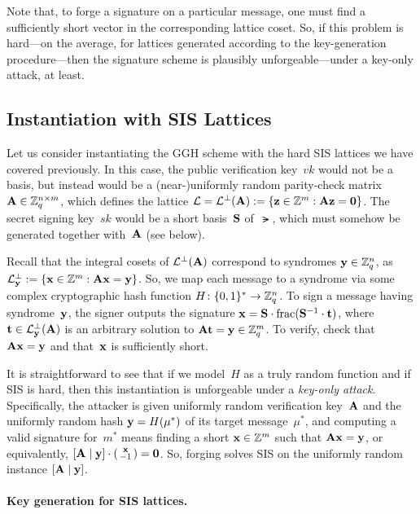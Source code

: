 \documentclass[11pt]{article}
\begin{document}
Note that, to forge a signature on a particular message, one must find
a sufficiently short vector in the corresponding lattice coset. So, if
this problem is hard---on the average, for lattices generated
according to the key-generation procedure---then the signature scheme
is plausibly unforgeable---under a key-only attack, at least.

\subsection{Instantiation with SIS Lattices}
\label{sec:instantiation-sis}

Let us consider instantiating the GGH scheme with the hard SIS
lattices we have covered previously. In this case, the public
verification key~$vk$ would not be a basis, but instead would be a
(near-)uniformly random parity-check matrix
$\mathbf{A} \in \mathbb{Z}_q^{n \times m}$, which defines the lattice
$\mathcal{L} = \mathcal{L}^{\perp}(\mathbf{A}) := \{\mathbf{z} \in \mathbb{Z}^{m} : \mathbf{A}
  \mathbf{z}=\mathbf{0}\}$. The secret signing key~$sk$ would be a short
basis~$\mathbf{S}$ of~$\lat$, which must somehow be generated together
with~$\mathbf{A}$ (see below).

Recall that the integral cosets of $\mathcal{L}^{\perp}(\mathbf{A})$ correspond to
syndromes $\mathbf{y} \in \mathbb{Z}_q^{n}$, as
$\mathcal{L}^{\perp}_{\mathbf{y}} := \{\mathbf{x} \in \mathbb{Z}^{m} : \mathbf{A} \mathbf{x} = \mathbf{y}\}$.
So, we map each message to a syndrome via some complex cryptographic
hash function $H \colon \{0,1\}^{*} \to \mathbb{Z}_q^{n}$. To sign a message
having syndrome~$\mathbf{y}$, the signer outputs the signature
$\mathbf{x} = \mathbf{S} \cdot \text{frac}(\mathbf{S}^{-1} \cdot \mathbf{t})$, where
$\mathbf{t} \in \mathcal{L}^{\perp}_{\mathbf{y}}(\mathbf{A})$ is an arbitrary solution to
$\mathbf{A} \mathbf{t} = \mathbf{y} \in \mathbb{Z}_q^m$. To verify, check that
$\mathbf{A} \mathbf{x} = \mathbf{y}$ and that~$\mathbf{x}$ is sufficiently short.

It is straightforward to see that if we model~$H$ as a truly random
function and if SIS is hard, then this instantiation is unforgeable
under a \emph{key-only attack}. Specifically, the attacker is given
uniformly random verification key~$\mathbf{A}$ and the uniformly random
hash $\mathbf{y} = H(\mu^{*})$ of its target message~$\mu^{*}$, and
computing a valid signature for~$m^{*}$ means finding a short
$\mathbf{x} \in \mathbb{Z}^m$ such that $\mathbf{A} \mathbf{x} = \mathbf{y}$, or equivalently,
$[\mathbf{A} \mid \mathbf{y}] \cdot \left(\begin{smallmatrix}\mathbf{x} \\ -1\end{smallmatrix}\right) = \mathbf{0}$. So,
forging solves SIS on the uniformly random instance
$[\mathbf{A} \mid \mathbf{y}]$.

\paragraph{Key generation for SIS lattices.}
\end{document}
